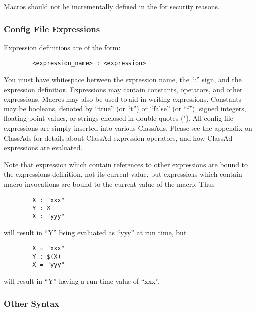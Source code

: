 \Note Macros should not be incrementally defined in the
 for security reasons.

\subsubsection{\label{sec:Config-File-Expressions}
Config File Expressions}

Expression definitions are of the form:
\begin{verbatim}
        <expression_name> : <expression>
\end{verbatim}
\Note You must have whitespace between the expression name,
the ``:'' sign, and the expression definition.  Expressions may
contain constants, operators, and other expressions.  Macros may also
be used to aid in writing expressions.  Constants may be booleans,
denoted by ``true'' (or ``t'') or ``false'' (or ``f''), signed
integers, floating point values, or strings enclosed in double quotes
(").  All config file expressions are simply inserted into various
ClassAds.  Please see the appendix on ClassAds for details about
ClassAd expression operators, and how ClassAd expressions are
evaluated.

Note that expression which contain references to other expressions are
bound to the expressions definition, not its current value, but
expressions which contain macro invocations are bound to the current
value of the macro.  Thus
\begin{verbatim}
        X : "xxx"
        Y : X
        X : "yyy"
\end{verbatim}
will result in ``Y'' being evaluated as ``yyy'' at run time, but
\begin{verbatim}
        X = "xxx"
        Y : $(X)
        X = "yyy" 
\end{verbatim}
will result in ``Y'' having a run time value of ``xxx''.

\subsubsection{\label{sec:Other-Syntax}
Other Syntax}

